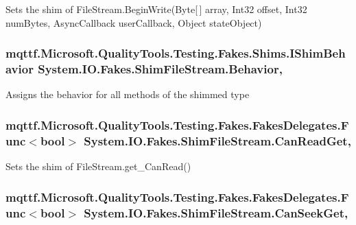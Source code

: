 Sets the shim of File\-Stream.\-Begin\-Write(\-Byte\mbox{[}$\,$\mbox{]} array, Int32 offset, Int32 num\-Bytes, Async\-Callback user\-Callback, Object state\-Object)

\hypertarget{class_system_1_1_i_o_1_1_fakes_1_1_shim_file_stream_a3cf081f5ffa8bbef176c5bc2ffffe977}{
\subsubsection[{Behavior}]{\setlength{\rightskip}{0pt plus 5cm}mqttf.\-Microsoft.\-Quality\-Tools.\-Testing.\-Fakes.\-Shims.\-I\-Shim\-Behavior System.\-I\-O.\-Fakes.\-Shim\-File\-Stream.\-Behavior\hspace{0.3cm}{\ttfamily [static]}, {\ttfamily [set]}}}\label{class_system_1_1_i_o_1_1_fakes_1_1_shim_file_stream_a3cf081f5ffa8bbef176c5bc2ffffe977}


Assigns the behavior for all methods of the shimmed type

\hypertarget{class_system_1_1_i_o_1_1_fakes_1_1_shim_file_stream_ae047b88b4470a23fc656c0cf26d45c45}{
\subsubsection[{Can\-Read\-Get}]{\setlength{\rightskip}{0pt plus 5cm}mqttf.\-Microsoft.\-Quality\-Tools.\-Testing.\-Fakes.\-Fakes\-Delegates.\-Func$<$bool$>$ System.\-I\-O.\-Fakes.\-Shim\-File\-Stream.\-Can\-Read\-Get\hspace{0.3cm}{\ttfamily [get]}, {\ttfamily [set]}}}\label{class_system_1_1_i_o_1_1_fakes_1_1_shim_file_stream_ae047b88b4470a23fc656c0cf26d45c45}


Sets the shim of File\-Stream.\-get\-\_\-\-Can\-Read()

\hypertarget{class_system_1_1_i_o_1_1_fakes_1_1_shim_file_stream_ab7b26ed4490da2968120bed9a9895a09}{
\subsubsection[{Can\-Seek\-Get}]{\setlength{\rightskip}{0pt plus 5cm}mqttf.\-Microsoft.\-Quality\-Tools.\-Testing.\-Fakes.\-Fakes\-Delegates.\-Func$<$bool$>$ System.\-I\-O.\-Fakes.\-Shim\-File\-Stream.\-Can\-Seek\-Get\hspace{0.3cm}{\ttfamily [get]}, {\ttfamily [set]}}}\label{class_system_1_1_i_o_1_1_fakes_1_1_shim_file_stream_ab7b26ed4490da2968120bed9a9895a09}



